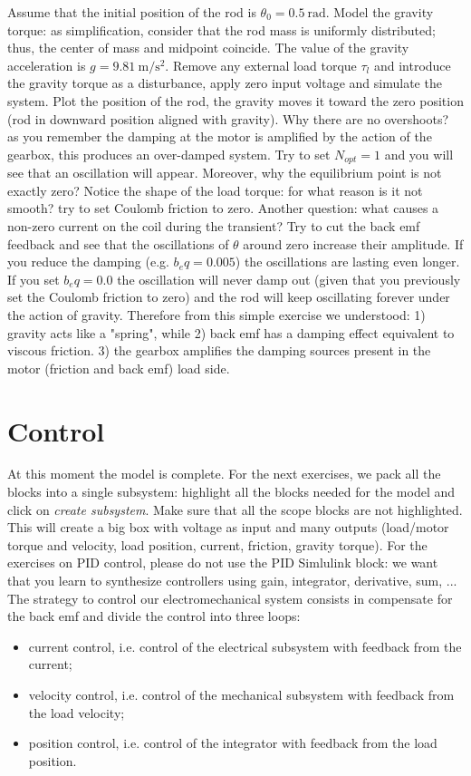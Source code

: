 \documentclass[11pt]{article}
\begin{document}
Assume that the initial position of the rod is $\theta_0 = 0.5 \ \mathrm{rad}$. 
Model the gravity torque: as simplification, consider that the rod mass is uniformly distributed; thus, 
the center of mass and midpoint coincide. The value of the gravity acceleration is $g = 9.81 \ \mathrm{m/s^2}$. 
Remove any external load torque $\tau_l$ and introduce the gravity torque as a 
disturbance, apply zero input voltage and simulate the system. 
Plot the position of the rod, the gravity moves it toward the zero position (rod in downward position aligned with gravity). 
Why there are no overshoots? as you remember the damping at the motor is amplified by the action of the gearbox, this 
produces an over-damped system. Try to set $N_{opt} = 1$ and you will see that an oscillation will appear. 
Moreover, why the equilibrium point is not exactly zero? Notice the shape of the load torque: 
for what reason is it not smooth? try to set Coulomb friction to zero.
Another question: what causes a non-zero current on the coil during the transient? %
Try to cut the back emf feedback and see that  the oscillations  of $\theta$  around zero increase their amplitude. %
If you reduce the damping (e.g. $b_eq = 0.005$) the oscillations are lasting even longer. 
If you set  $b_eq = 0.0$ the oscillation will never damp out (given that you previously set the Coulomb friction to zero) 
and the rod will keep oscillating forever under  the action of gravity. 
Therefore from this simple exercise we understood: 1) gravity acts like a "spring", while 2) back emf has a damping effect equivalent to  viscous friction. 
3) the gearbox amplifies the damping sources present in the motor (friction and back emf) load side.
%


\par
\section{Control}
\noindent At this moment the model is complete. For the next exercises, 
we pack all the blocks into a single subsystem: highlight all the blocks needed for the model 
and click on \emph{create subsystem}. Make sure that all the scope blocks are not highlighted. 
This will create a big box with voltage as input and many outputs (load/motor torque and velocity, 
load position, current, friction, gravity torque). For the exercises on PID control, please do not use the PID Simlulink block: we want that you learn to synthesize controllers using gain, integrator, derivative, sum, ... 
The strategy to control our electromechanical system consists in compensate for the back emf and divide the control into three loops:
\begin{itemize}
	\item current control, i.e. control of the electrical subsystem with feedback from the current;
	\item velocity control, i.e. control of the mechanical subsystem with feedback from the load velocity;
	\item position control, i.e. control of the integrator with feedback from the load position.
\end{itemize}
\end{document}
